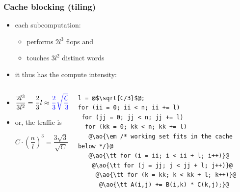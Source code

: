 \documentclass[12pt,dvipdfmx]{beamer}
\newcommand{\ao}[1]{{\color{blue}#1}}
\begin{document}
\begin{frame}[fragile]
\frametitle{Cache blocking (tiling)}
\begin{itemize}
\item<1-> each subcomputation:
  \begin{itemize}
  \item performs \ao{$2l^3$} flops and
  \item touches \ao{$3l^2$} distinct words
  \end{itemize}
\item<2-> it thus has the compute intensity:
\end{itemize}

\begin{columns}
\begin{column}{0.45\textwidth}
\begin{itemize}
\item<2->[]
\[ \frac{2l^3}{3l^2} = \frac{2}{3}l \approx \ao{\frac{2}{3}\sqrt{\frac{C}{3}}} \]

\item<3-> or, the traffic is

\[ C \cdot \left(\frac{n}{l}\right)^3 = \frac{3\sqrt{3}}{\sqrt{C}}n^3 \]

\end{itemize}
\end{column}

\begin{column}{0.55\textwidth}
\begin{lstlisting}
l = @$\sqrt{C/3}$@;
for (ii = 0; ii < n; ii += l)
 for (jj = 0; jj < n; jj += l)
  for (kk = 0; kk < n; kk += l)
   @\ao{\em /* working set fits in the cache below */}@
   @\ao{\tt for (i = ii; i < ii + l; i++)}@
    @\ao{\tt for (j = jj; j < jj + l; j++)}@
     @\ao{\tt for (k = kk; k < kk + l; k++)}@
      @\ao{\tt A(i,j) += B(i,k) * C(k,j);}@
\end{lstlisting}
\end{column}
\end{columns}
\end{frame}
\end{document}
